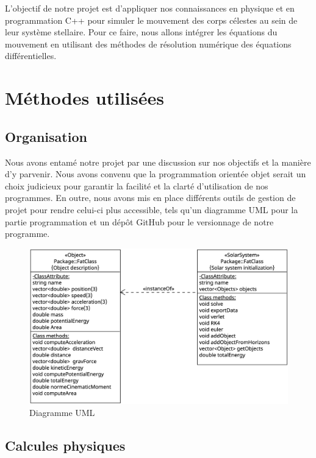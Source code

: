 \documentclass[11pt]{article}
\begin{document}
L'objectif de notre projet est d'appliquer nos connaissances en physique et en programmation C++ pour simuler le mouvement des corps célestes au sein de leur système stellaire. Pour ce faire, nous allons intégrer les équations du mouvement en utilisant des méthodes de résolution numérique des équations différentielles.\\

\section{Méthodes utilisées}
\subsection{Organisation}

Nous avons entamé notre projet par une discussion sur nos objectifs et la manière d'y parvenir. Nous avons convenu que la programmation orientée objet serait un choix judicieux pour garantir la facilité et la clarté d'utilisation de nos programmes. En outre, nous avons mis en place différents outils de gestion de projet pour rendre celui-ci plus accessible, tels qu'un diagramme UML pour la partie programmation et un dépôt GitHub pour le versionnage de notre programme.

\begin{center}
\begin{figure}
    \centering
    \includegraphics[width=0.7\linewidth]{orbial.png}
    \caption{Diagramme UML}
    \label{Diagramme UML}
\end{figure}
\end{center}
\subsection{Calcules physiques}
\end{document}

